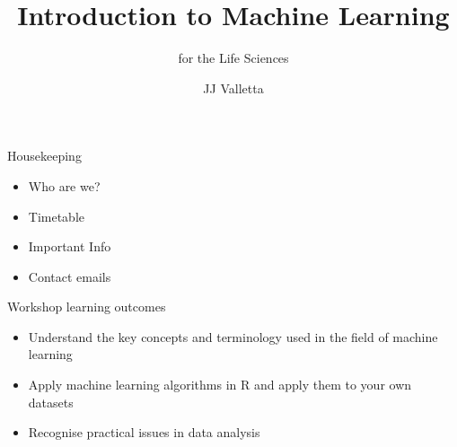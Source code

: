 \documentclass[pdf]{beamer}
\title{Introduction to Machine Learning}
\subtitle{for the Life Sciences}
\author{JJ Valletta}
\begin{document}
\begin{frame}
\titlepage
\end{frame}
\begin{frame}{Housekeeping}
\begin{itemize}
	\item Who are we?
	\item Timetable
	\item Important Info
	\item Contact emails
\end{itemize}
\end{frame}
\begin{frame}{Workshop learning outcomes}
\begin{itemize}\addtolength{\itemsep}{0.5\baselineskip}
	\item Understand the key concepts and terminology used in the field of machine learning
	\item Apply machine learning algorithms in R and apply them to your own datasets
	\item Recognise practical issues in data analysis
\end{itemize}
\end{frame}
\end{document}
